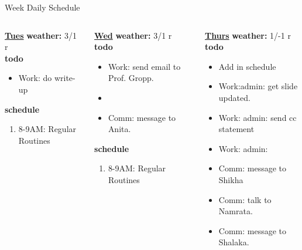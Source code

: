 \begin{columns}
\begin{column}{0.6\linewidth}
\begin{block}{Week Daily Schedule}
\begin{columns}
          \begin{column}{0.14\textwidth}{\small \underline{\bf Tues}}
            {\bf {\tiny  weather:} } {\tiny 3/1 r} \\ 
            {\bf {\tiny todo}}\\ 
            \begin{itemize}
              \tiny \item \tiny Work: do write-up 
            \end{itemize} 
                {{\bf {\tiny  schedule}}}
                \begin{enumerate} 
                  \tiny \item \tiny 8-9AM: Regular Routines 
                \end{enumerate} 
          \end{column}
          \begin{column}{0.14\textwidth}{\small \underline{\bf Wed}}
            {\tiny \bf weather: } {\tiny 3/1 r} \\ 
            {\tiny {\bf todo}}\\
            \begin{itemize}
              \tiny \item \tiny Work: send email to Prof. Gropp. 
            \item \tiny 
            \item \tiny Comm: message to Anita. 
            \end{itemize}
                {\tiny \bf schedule}\\
                \begin{enumerate} 
                  \tiny \item \tiny 8-9AM: Regular Routines 
                \end{enumerate} 
          \end{column}

          \begin{column}{0.14\textwidth}{\small \underline{\bf Thurs}}
            {\tiny \bf weather: } {\tiny 1/-1 r }\\ 
            {\tiny \bf todo} \\ 
            \begin{itemize}
              \tiny \item \tiny Add in schedule 
            \item \tiny Work:admin: get slide updated.  
              \item \tiny Work: admin: send cc statement 
              \item \tiny Work: admin: 
                \item \tiny Comm: message to Shikha
                  \item \tiny Comm: talk to Namrata. 
                    \item \tiny Comm: message to Shalaka. 


\end{itemize}
\end{column}
\end{columns}
\end{block}
\end{column}
\end{columns}
